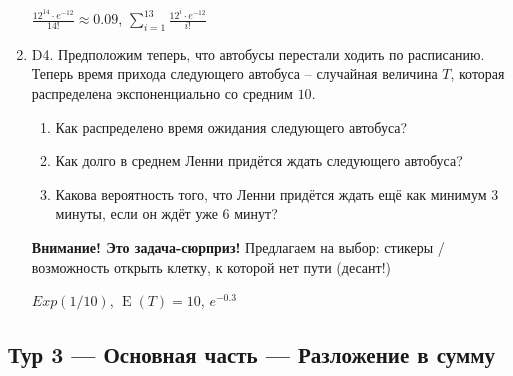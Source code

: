 \documentclass[12pt]{article}
\DeclareMathOperator{\E}{E}
\newenvironment{problem}{}{}
\newenvironment{sol}{}{} %
\begin{document}
\begin{enumerate}
\begin{problem}
\begin{sol} 

$\frac{12^{14} \cdot e^{-12}}{14!} \approx 0.09$, $\sum_{i=1}^{13} \frac{12^{i} \cdot e^{-12}}{i!}$

\end{sol}
\end{problem}

\begin{problem}
\item[D4.] Предположим теперь, что автобусы перестали ходить по расписанию. Теперь время прихода следующего автобуса – случайная величина $T$, которая распределена экспоненциально со средним $10$. 

\begin{enumerate}
\item Как распределено время ожидания следующего автобуса?
\item Как долго в среднем Ленни придётся ждать следующего автобуса?
\item Какова вероятность того, что Ленни придётся ждать ещё как минимум 3 минуты, если он ждёт уже 6 минут?
\end{enumerate}

\begin{sol}
\textbf{Внимание! Это задача-сюрприз!} Предлагаем на выбор: стикеры / возможность открыть клетку, к которой нет пути (десант!)

$Exp(1/10)$, $\E(T) = 10$, $e^{-0.3}$
\end{sol}
\end{problem}

\end{enumerate}

\newpage
\subsection{Тур 3 — Основная часть — Разложение в сумму}
\end{document}
